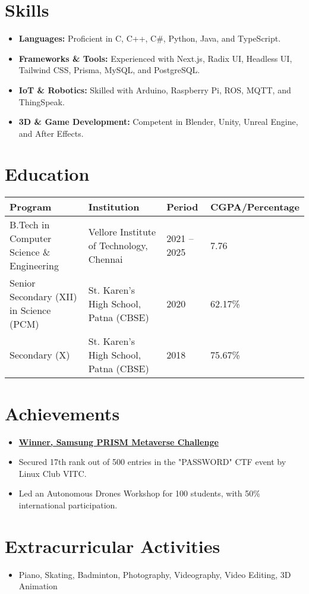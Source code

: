 \documentclass[a4paper,10pt]{article}
\newcommand{\sectionbreak}{\vspace{0.2em}}
\begin{document}
\section{Skills}
\begin{itemize}[noitemsep, topsep=0pt]
    \item \textbf{Languages:} Proficient in C, C++, C\#, Python, Java, and TypeScript.
    \item \textbf{Frameworks \& Tools:} Experienced with Next.js, Radix UI, Headless UI, Tailwind CSS, Prisma, MySQL, and PostgreSQL.
    \item \textbf{IoT \& Robotics:} Skilled with Arduino, Raspberry Pi, ROS, MQTT, and ThingSpeak.
    \item \textbf{3D \& Game Development:} Competent in Blender, Unity, Unreal Engine, and After Effects.
\end{itemize}

\sectionbreak

\section{Education}
\begin{tabular}{|l|l|l|l|}
\hline
\textbf{Program} & \textbf{Institution} & \textbf{Period} & \textbf{CGPA/Percentage} \\ \hline
B.Tech in Computer Science \& Engineering & Vellore Institute of Technology, Chennai & 2021 – 2025 & 7.76 \\ \hline
Senior Secondary (XII) in Science (PCM) & St. Karen's High School, Patna (CBSE) & 2020 & 62.17\% \\ \hline
Secondary (X) & St. Karen's High School, Patna (CBSE) & 2018 & 75.67\% \\ \hline
\end{tabular}

\sectionbreak

\section{Achievements}
\begin{itemize}[noitemsep, topsep=0pt]
    \item \href{https://drive.google.com/file/d/19xeCrN3ycqXisyDDgIYeygRRVawMKOxu/view?usp=sharing}{\textcolor{accentcolor}{\textbf{Winner, Samsung PRISM Metaverse Challenge}}}
    \item Secured 17th rank out of 500 entries in the "PASSWORD" CTF event by Linux Club VITC.
    \item Led an Autonomous Drones Workshop for 100 students, with 50\% international participation.
\end{itemize}

\sectionbreak

\section{Extracurricular Activities}
\begin{itemize}[noitemsep, topsep=0pt]
    \item Piano, Skating, Badminton, Photography, Videography, Video Editing, 3D Animation
\end{itemize}
\end{document}
